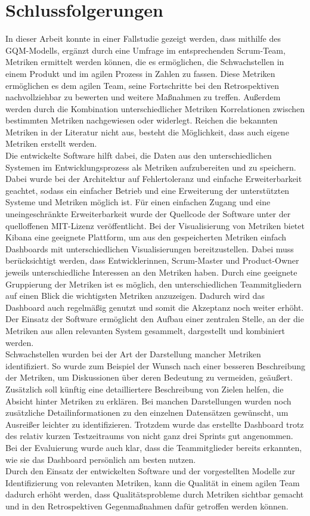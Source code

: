 \chapter{Schlussfolgerungen}

In dieser Arbeit konnte in einer Fallstudie gezeigt werden, dass mithilfe des \ac{GQM}-Modells, ergänzt durch eine Umfrage im entsprechenden Scrum-Team, Metriken ermittelt werden können, die es ermöglichen, die Schwachstellen in einem Produkt und im agilen Prozess in Zahlen zu fassen.
Diese Metriken ermöglichen es dem agilen Team, seine Fortschritte bei den Retrospektiven nachvollziehbar zu bewerten und weitere Maßnahmen zu treffen.
Außerdem werden durch die Kombination unterschiedlicher Metriken Korrelationen zwischen bestimmten Metriken nachgewiesen oder widerlegt.
Reichen die bekannten Metriken in der Literatur nicht aus, besteht die Möglichkeit, dass auch eigene Metriken erstellt werden.
\\
Die entwickelte Software hilft dabei, die Daten aus den unterschiedlichen Systemen im Entwicklungsprozess als Metriken aufzubereiten und zu speichern.
Dabei wurde bei der Architektur auf Fehlertoleranz und einfache Erweiterbarkeit geachtet, sodass ein einfacher Betrieb und eine Erweiterung der unterstützten Systeme und Metriken möglich ist.
Für einen einfachen Zugang und eine uneingeschränkte Erweiterbarkeit wurde der Quellcode der Software unter der quelloffenen MIT-Lizenz veröffentlicht.
Bei der Visualisierung von Metriken bietet Kibana eine geeignete Plattform, um aus den gespeicherten Metriken einfach Dashboards mit unterschiedlichen Visualisierungen bereitzustellen.
Dabei muss berücksichtigt werden, dass Entwicklerinnen, Scrum-Master und Product-Owner jeweils unterschiedliche Interessen an den Metriken haben.
Durch eine geeignete Gruppierung der Metriken ist es möglich, den unterschiedlichen Teammitgliedern auf einen Blick die wichtigsten Metriken anzuzeigen.
Dadurch wird das Dashboard auch regelmäßig genutzt und somit die Akzeptanz noch weiter erhöht.
Der Einsatz der Software ermöglicht den Aufbau einer zentralen Stelle, an der die Metriken aus allen relevanten System gesammelt, dargestellt und kombiniert werden.
\\
Schwachstellen wurden bei der Art der Darstellung mancher Metriken identifiziert.
So wurde zum Beispiel der Wunsch nach einer besseren Beschreibung der Metriken, um Diskussionen über deren Bedeutung zu vermeiden, geäußert.
Zusätzlich soll künftig eine detailliertere Beschreibung von Zielen helfen, die Absicht hinter Metriken zu erklären.
Bei manchen Darstellungen wurden noch zusätzliche Detailinformationen zu den einzelnen Datensätzen gewünscht, um Ausreißer leichter zu identifizieren.
Trotzdem wurde das erstellte Dashboard trotz des relativ kurzen Testzeitraums von nicht ganz drei Sprints gut angenommen.
Bei der Evaluierung wurde auch klar, dass die Teammitglieder bereits erkannten, wie sie das Dashboard persönlich am besten nutzen.
\\
Durch den Einsatz der entwickelten Software und der vorgestellten Modelle zur Identifizierung von relevanten Metriken, kann die Qualität in einem agilen Team dadurch erhöht werden, dass Qualitätsprobleme durch Metriken sichtbar gemacht und in den Retrospektiven Gegenmaßnahmen dafür getroffen werden können.
